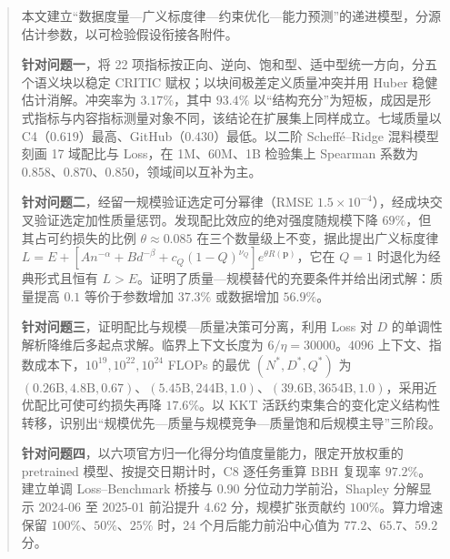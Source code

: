 \begin{abstract}

本文建立“数据度量—广义标度律—约束优化—能力预测”的递进模型，分源估计参数，以可检验假设衔接各附件。

\textbf{针对问题一}，将 22 项指标按正向、逆向、饱和型、适中型统一方向，分五个语义块以稳定 CRITIC 赋权；以块间极差定义质量冲突并用 Huber 稳健估计消解。冲突率为 $3.17\%$，其中 $93.4\%$ 以“结构充分”为短板，成因是形式指标与内容指标测量对象不同，该结论在扩展集上同样成立。七域质量以 C4（$0.619$）最高、GitHub（$0.430$）最低。以二阶 Scheff\'e--Ridge 混料模型刻画 17 域配比与 Loss，在 1M、60M、1B 检验集上 Spearman 系数为 $0.858$、$0.870$、$0.850$，领域间以互补为主。

\textbf{针对问题二}，经留一规模验证选定可分幂律（RMSE $1.5\times10^{-4}$），经成块交叉验证选定加性质量惩罚。发现配比效应的绝对强度随规模下降 $69\%$，但其占可约损失的比例 $\theta\approx0.085$ 在三个数量级上不变，据此提出广义标度律 $L=E+[An^{-\alpha}+Bd^{-\beta}+c_Q(1-Q)^{\nu_Q}]e^{\theta R(\boldsymbol p)}$，它在 $Q=1$ 时退化为经典形式且恒有 $L>E$。证明了质量—规模替代的充要条件并给出闭式解：质量提高 $0.1$ 等价于参数增加 $37.3\%$ 或数据增加 $56.9\%$。

\textbf{针对问题三}，证明配比与规模—质量决策可分离，利用 Loss 对 $D$ 的单调性解析降维后多起点求解。临界上下文长度为 $6/\eta=30000$。$4096$ 上下文、指数成本下，$10^{19},10^{22},10^{24}$ FLOPs 的最优 $(N^*,D^*,Q^*)$ 为 $(0.26\mathrm B,4.8\mathrm B,0.67)$、$(5.45\mathrm B,244\mathrm B,1.0)$、$(39.6\mathrm B,3654\mathrm B,1.0)$，采用近优配比可使可约损失再降 $17.6\%$。以 KKT 活跃约束集合的变化定义结构性转移，识别出“规模优先—质量与规模竞争—质量饱和后规模主导”三阶段。

\textbf{针对问题四}，以六项官方归一化得分均值度量能力，限定开放权重的 pretrained 模型、按提交日期计时，C8 逐任务重算 BBH 复现率 $97.2\%$。建立单调 Loss--Benchmark 桥接与 $0.90$ 分位动力学前沿，Shapley 分解显示 2024-06 至 2025-01 前沿提升 $4.62$ 分，规模扩张贡献约 $100\%$。算力增速保留 $100\%$、$50\%$、$25\%$ 时，24 个月后能力前沿中心值为 $77.2$、$65.7$、$59.2$ 分。


\end{abstract}
